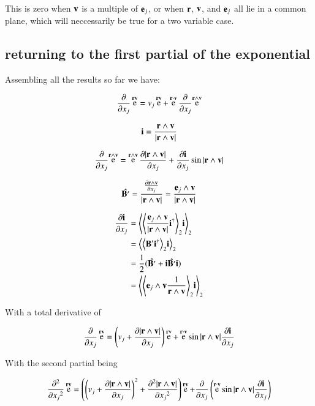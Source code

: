 \documentclass{article}      %
\newcommand{\dxj}[2] {\frac {\partial {#1}} {\partial {x_{#2}}}}
\newcommand{\dsqxj}[2] {\frac {\partial^2 {#1}} {\partial {x_{#2}}^2}}
\DeclareMathOperator{\Exp}{e}
\newcommand{\gpgrade}[2] {{\left\langle{{#1}}\right\rangle}_{#2}}
\newcommand{\gpgradetwo}[1] {\gpgrade{#1}{2}}
\begin{document}
This is zero when $\mathbf{v}$ is a multiple of $\mathbf{e}_j$, or when $\mathbf{r}$, $\mathbf{v}$, and $\mathbf{e}_j$ all lie in a common plane, which will neccessarily be true for a two variable case.

\subsection{ returning to the first partial of the exponential }

Assembling all the results so far we have:

\begin{align*}
\dxj{}{j}\Exp^{\Br\Bv} 
&= v_j\Exp^{\Br\Bv} + \Exp^{\Br \cdot \Bv}\dxj{}{j}{\Exp^{\Br \wedge \Bv}} \\
\end{align*}

\[
\mathbf{i} = \frac{\mathbf{r} \wedge \mathbf{v}}{\lvert{\mathbf{r}\wedge \mathbf{v}}\rvert}
\]

\begin{align*}
\dxj{}{j}{\Exp^{\Br \wedge \Bv}} 
&= \Exp^{\Br \wedge \Bv} \dxj{\abs{\Br \wedge \Bv}}{j} + \dxj{\Bi}{j} \sin{\abs{\Br \wedge \Bv}} \\
\end{align*}

\[
\hat{\BB'} 
= \frac{ \dxj{\Br \wedge \Bv}{j} }{\abs{\Br \wedge \Bv}}
= \frac{\Be_j \wedge \Bv}{\abs{\Br \wedge \Bv}}
\]

\begin{align*}
\dxj{\Bi}{j}
&= \gpgradetwo{ \gpgradetwo{ \frac{\Be_j \wedge \Bv}{\abs{\Br \wedge \Bv}} \Bi^\dagger } \Bi } \\
&= \gpgradetwo{ \gpgradetwo{ \BB' \Bi^\dagger } \Bi } \\
&= \inv{2} (\hat{\BB'} + \Bi\hat{\BB'}\Bi) \\
&= \gpgradetwo{ \gpgradetwo{ {\Be_j \wedge \Bv}\inv{{\Br \wedge \Bv}} } \Bi } \\
\end{align*}

With a total derivative of

\begin{align*}
\dxj{}{j}\Exp^{\Br\Bv} 
&=
\left(v_j + \dxj{\abs{\Br \wedge \Bv}}{j}\right) \Exp^{\Br\Bv}
+\Exp^{\Br \cdot \Bv} \sin{\abs{\Br \wedge \Bv}}\dxj{\Bi}{j} \\
\end{align*}

With the second partial being

\begin{align*}
\dsqxj{}{j}\Exp^{\Br\Bv} 
&=
\left( 
      \left(v_j + \dxj{\abs{\Br \wedge \Bv}}{j}\right)^2
    + \dsqxj{\abs{\Br \wedge \Bv}}{j}
\right)
   \Exp^{\Br\Bv}
+\dxj{}{j}\left(\Exp^{\Br \cdot \Bv} \sin{\abs{\Br \wedge \Bv}}\dxj{\Bi}{j}\right) \\
\end{align*}
\end{document}
